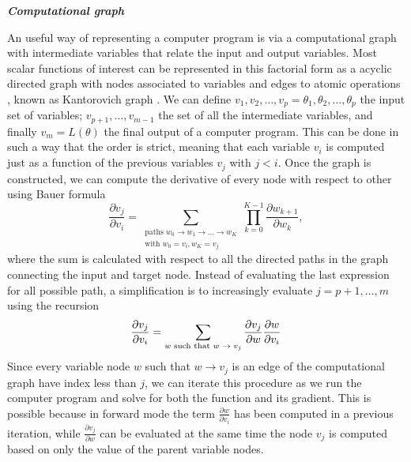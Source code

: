 \vspace*{10px}
\noindent \textbf{\textit{Computational graph}}
\vspace*{5px}

An useful way of representing a computer program is via a computational graph with intermediate variables that relate the input and output variables. 
Most scalar functions of interest can be represented in this factorial form as a acyclic directed graph with nodes associated to variables and edges to atomic operations \cite{griewank2008evaluatingderivatives, Griewack-on-AD}, known as Kantorovich graph \cite{kantorovich1957mathematical}. 
We can define $v_1, v_2, \ldots, v_p = \theta_1, \theta_2, \ldots, \theta_p$ the input set of variables; $v_{p+1}, \ldots, v_{m-1}$ the set of all the intermediate variables, and finally $v_m = L(\theta)$ the final output of a computer program. 
This can be done in such a way that the order is strict, meaning that each variable $v_i$ is computed just as a function of the previous variables $v_j$ with $j < i$. 
Once the graph is constructed, we can compute the derivative of every node with respect to other using Bauer formula \cite{Bauer_1974, Oktay_randomized-AD}
\begin{equation}
    \frac{\partial v_j}{\partial v_i}
    = 
    \sum_{\substack{ \text{paths }w_0 \rightarrow w_1 \rightarrow \ldots \rightarrow w_K \\
                    \text{with } w_0=v_i, w_K = v_j}}
    \prod_{k=0}^{K-1} \frac{\partial w_{k+1}}{\partial w_{k}},
\end{equation}
where the sum is calculated with respect to all the directed paths in the graph connecting the input and target node.
Instead of evaluating the last expression for all possible path, a simplification is to increasingly evaluate $j=p+1, \ldots, m$ using the recursion 
\begin{equation}
    \frac{\partial v_j}{\partial v_i}
    = 
    \sum_\text{$w$\text{ such that} $w \rightarrow v_j$}
    \frac{\partial v_j}{\partial w}
    \frac{\partial w}{\partial v_i} 
    \label{eq:AD-graph-recursion}
\end{equation}
Since every variable node $w$ such that $w \rightarrow v_j$ is an edge of the computational graph have index less than $j$, we can iterate this procedure as we run the computer program and solve for both the function and its gradient.
This is possible because in forward mode the term $\frac{\partial w}{\partial v_i}$ has been computed in a previous iteration, while $\frac{\partial v_j}{\partial w}$ can be evaluated at the same time the node $v_j$ is computed based on only the value of the parent variable nodes. 


